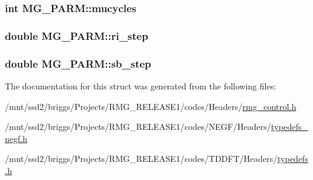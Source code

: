\hypertarget{struct_m_g___p_a_r_m_a24e0b30e3b9d8316006b5523294b17d8}{
\subsubsection[{mucycles}]{\setlength{\rightskip}{0pt plus 5cm}int M\-G\-\_\-\-P\-A\-R\-M\-::mucycles}}\label{struct_m_g___p_a_r_m_a24e0b30e3b9d8316006b5523294b17d8}
\hypertarget{struct_m_g___p_a_r_m_a069d9320141785c704307969b7904774}{
\subsubsection[{ri\-\_\-step}]{\setlength{\rightskip}{0pt plus 5cm}double M\-G\-\_\-\-P\-A\-R\-M\-::ri\-\_\-step}}\label{struct_m_g___p_a_r_m_a069d9320141785c704307969b7904774}
\hypertarget{struct_m_g___p_a_r_m_a43933c75f7ede8ab195cea37b0259df5}{
\subsubsection[{sb\-\_\-step}]{\setlength{\rightskip}{0pt plus 5cm}double M\-G\-\_\-\-P\-A\-R\-M\-::sb\-\_\-step}}\label{struct_m_g___p_a_r_m_a43933c75f7ede8ab195cea37b0259df5}


The documentation for this struct was generated from the following files\-:\begin{DoxyCompactItemize}
\item 
/mnt/ssd2/briggs/\-Projects/\-R\-M\-G\-\_\-\-R\-E\-L\-E\-A\-S\-E1/codes/\-Headers/\hyperlink{rmg__control_8h}{rmg\-\_\-control.\-h}\item 
/mnt/ssd2/briggs/\-Projects/\-R\-M\-G\-\_\-\-R\-E\-L\-E\-A\-S\-E1/codes/\-N\-E\-G\-F/\-Headers/\hyperlink{typedefs__negf_8h}{typedefs\-\_\-negf.\-h}\item 
/mnt/ssd2/briggs/\-Projects/\-R\-M\-G\-\_\-\-R\-E\-L\-E\-A\-S\-E1/codes/\-T\-D\-D\-F\-T/\-Headers/\hyperlink{_t_d_d_f_t_2_headers_2typedefs_8h}{typedefs.\-h}\end{DoxyCompactItemize}
